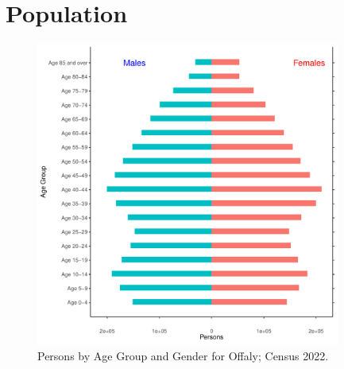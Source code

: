 \documentclass{article}
\begin{document}
\pagebreak

\section{Population} 
\label{sect:Pop}

\begin{figure}[h]
	\centering
	\includegraphics[width = 100mm]{../figures/PyramidPlot.pdf}
	\caption{Persons by Age Group and Gender for Offaly; Census 2022.}
	\label{fig:2ae19629-1a6a-13a3-e055-000000000001}
	\end{figure}
\end{document}
